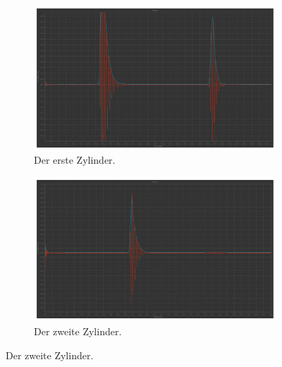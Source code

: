 \begin{figure}%
  \begin{subfigure}{0.48\textwidth}%
  \centering%
  \includegraphics[width=\linewidth]{pictures/Durchschallung/z1.pdf}%
  \caption{Der erste Zylinder.}%
  \label{fig:durchschallung_z1}%
  \end{subfigure}%
  \hfill%
  \begin{subfigure}{0.48\textwidth}%
  \centering%
  \includegraphics[width=\linewidth]{pictures/Durchschallung/z2.pdf}%
  \caption{Der zweite Zylinder.}%
  \label{fig:durchschallung_z2}%
  \end{subfigure}%
  \hfill


\end{figure}
